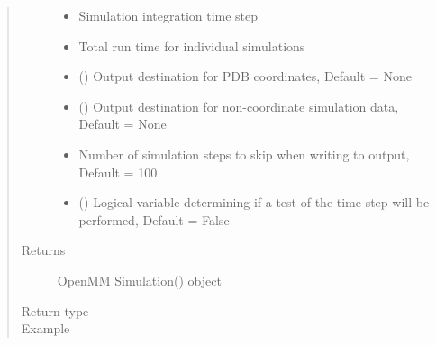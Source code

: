 \documentclass[letterpaper,12pt,english,openany,oneside]{sphinxmanual}
\begin{document}
\begin{fulllineitems}
\begin{quote}
\begin{description}
\begin{itemize}
\item {} 
 \textendash{} Simulation integration time step

\item {} 
 \textendash{} Total run time for individual simulations

\item {} 
 () \textendash{} Output destination for PDB coordinates, Default = None

\item {} 
 () \textendash{} Output destination for non-coordinate simulation data, Default = None

\item {} 
 \textendash{} Number of simulation steps to skip when writing to output, Default = 100

\item {} 
 () \textendash{} Logical variable determining if a test of the time step will be performed, Default = False

\end{itemize}

\item[{Returns}] \leavevmode
OpenMM Simulation() object

\item[{Return type}] \leavevmode



\item[{Example}] \leavevmode
\end{description}\end{quote}


\end{fulllineitems}
\end{document}
